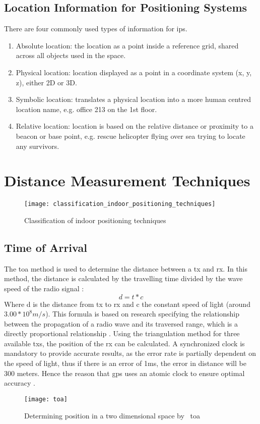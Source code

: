 \subsection{Location Information for Positioning Systems}
There are four commonly used types of information for \acrshort{ips}\cite{Liu2007}.
\begin{enumerate}
\item Absolute location: the location as a point inside a reference grid, shared across all objects used in the space.
\item Physical location: location displayed as a point in a coordinate system (x, y, z), either 2D or 3D.
\item Symbolic location: translates a physical location into a more human centred location name, e.g. office 213 on the 1st floor.
\item Relative location: location is based on the relative distance or proximity to a beacon or base point, e.g. rescue helicopter flying over sea trying to locate any survivors.
\end{enumerate}
\section{Distance Measurement Techniques}
\begin{figure}[h!]
\centering
\texttt{[image: classification\_indoor\_positioning\_techniques]}
\caption{Classification of indoor positioning techniques~\cite{Sakpere2017}}
\label{fig:ips_techniques}
\end{figure}
\subsection{Time of Arrival}
The \acrfull{toa} method is used to determine the distance between a \acrfull{tx} and \acrfull{rx}. In this method, the distance is calculated by the travelling time divided by the wave speed of the radio signal \cite{Loy2018}:
\begin{equation}
d = t * c
\end{equation}
Where d is the distance from \acrshort{tx} to \acrshort{rx} and c the constant speed of light (around $3.00 * 10^8 m/s$). This formula is based on research specifying the relationship between the propagation of a radio wave and its traversed range, which is a directly proportional relationship \cite{S2016}. Using the triangulation method for three available \acrlong{tx}s, the position of the \acrlong{rx} can be calculated. A synchronized clock is mandatory to provide accurate results, as the error rate is partially dependent on the speed of light, thus if there is an error of 1ms, the error in distance will be 300 meters. Hence the reason that \acrfull{gps} uses an atomic clock to ensure optimal accuracy \cite{Jindal}.
\begin{figure}[h!]
\centering
\texttt{[image: toa]}
\caption{Determining position in a two dimensional space by ~\acrlong{toa}~\cite{Jindal}}
\label{fig:toa}
\end{figure}
